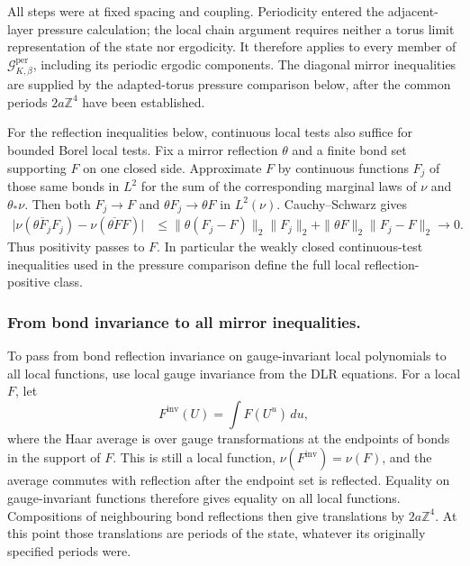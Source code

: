 \documentclass[11pt,letterpaper,reqno]{amsart}
\theoremstyle{definition}
\theoremstyle{remark}
\begin{document}
All steps were at fixed spacing and coupling. Periodicity entered
the adjacent-layer pressure calculation; the local chain argument
requires neither a torus limit representation of the state nor
ergodicity. It therefore applies to every member of
$\mathcal G^{\mathrm{per}}_{K,\beta}$, including its periodic ergodic
components. The diagonal mirror inequalities are supplied by the
adapted-torus pressure comparison below, after the common periods
$2a\mathbb Z^4$ have been established.

For the reflection inequalities below, continuous local tests also
suffice for bounded Borel local tests. Fix a mirror reflection
$\theta$ and a finite bond set supporting $F$ on one closed side.
Approximate $F$ by continuous functions $F_j$ of those same bonds in
$L^2$ for the sum of the corresponding marginal laws of $\nu$ and
$\theta_*\nu$. Then both $F_j\to F$ and
$\theta F_j\to\theta F$ in $L^2(\nu)$. Cauchy--Schwarz gives
\[
 \begin{split}
 \big|\nu(\overline{\theta F_j}F_j)
             -\nu(\overline{\theta F}F)\big|
 &\le\|\theta(F_j-F)\|_2\|F_j\|_2
       +\|\theta F\|_2\|F_j-F\|_2
 \longrightarrow0.
 \end{split}
\]
Thus positivity passes to $F$. In particular the weakly closed
continuous-test inequalities used in the pressure comparison define
the full local reflection-positive class.

\subsubsection*{From bond invariance to all mirror inequalities.}
To pass from bond reflection invariance on gauge-invariant local
polynomials to all local functions, use local gauge invariance from
the DLR equations.
For a local $F$, let
\[
 F^{\mathrm{inv}}(U)=\int F(U^u)\,du,
\]
where the Haar average is over gauge transformations at the endpoints
of bonds in the support of $F$. This is still a local function,
$\nu(F^{\mathrm{inv}})=\nu(F)$, and the average commutes with
reflection after the endpoint set is reflected. Equality on
gauge-invariant functions therefore gives equality on all local
functions. Compositions of neighbouring bond reflections then give
translations by $2a\mathbb Z^4$. At this point those translations are
periods of the state, whatever its originally specified periods were.
\end{document}
